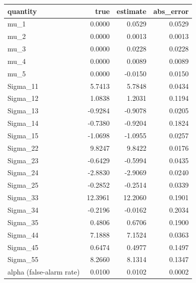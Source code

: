 \begin{tabular}{lrrr}
\toprule
quantity & true & estimate & abs_error \\
\midrule
mu_1 & 0.0000 & 0.0529 & 0.0529 \\
mu_2 & 0.0000 & 0.0013 & 0.0013 \\
mu_3 & 0.0000 & 0.0228 & 0.0228 \\
mu_4 & 0.0000 & 0.0089 & 0.0089 \\
mu_5 & 0.0000 & -0.0150 & 0.0150 \\
Sigma_11 & 5.7413 & 5.7848 & 0.0434 \\
Sigma_12 & 1.0838 & 1.2031 & 0.1194 \\
Sigma_13 & -0.9284 & -0.9078 & 0.0205 \\
Sigma_14 & -0.7380 & -0.9204 & 0.1824 \\
Sigma_15 & -1.0698 & -1.0955 & 0.0257 \\
Sigma_22 & 9.8247 & 9.8422 & 0.0176 \\
Sigma_23 & -0.6429 & -0.5994 & 0.0435 \\
Sigma_24 & -2.8830 & -2.9069 & 0.0240 \\
Sigma_25 & -0.2852 & -0.2514 & 0.0339 \\
Sigma_33 & 12.3961 & 12.2060 & 0.1901 \\
Sigma_34 & -0.2196 & -0.0162 & 0.2034 \\
Sigma_35 & 0.4806 & 0.6706 & 0.1900 \\
Sigma_44 & 7.1888 & 7.1524 & 0.0363 \\
Sigma_45 & 0.6474 & 0.4977 & 0.1497 \\
Sigma_55 & 8.2660 & 8.1314 & 0.1347 \\
alpha (false-alarm rate) & 0.0100 & 0.0102 & 0.0002 \\
\bottomrule
\end{tabular}
